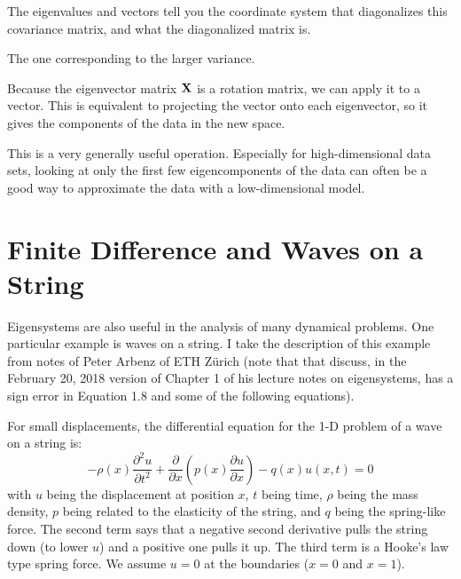 
The eigenvalues and vectors tell you the coordinate system that
diagonalizes this covariance matrix, and what the diagonalized matrix
is.


\begin{answer}
The one corresponding to the larger variance.
\end{answer}

Because the eigenvector matrix ${\bf X}$ is a rotation matrix, we can
apply it to a vector.  This is equivalent to projecting the vector
onto each eigenvector, so it gives the components of the data in the
new space.

This is a very generally useful operation. Especially for
high-dimensional data sets, looking at only the first few
eigencomponents of the data can often be a good way to approximate the
data with a low-dimensional model.

\section{Finite Difference and Waves on a String}

Eigensystems are also useful in the analysis of many dynamical
problems. One particular example is waves on a string. I take the
description of this example from notes of Peter Arbenz of ETH Z\"urich
(note that that discuss, in the February 20, 2018 version of Chapter 1
of his lecture notes on eigensystems, has a sign error in Equation 1.8
and some of the following equations).

For small displacements, the differential equation for the 1-D problem
of a wave on a string is:
\begin{equation}
- \rho(x) \frac{\partial^2 u}{\partial t^2}
+ \frac{\partial }{\partial x}\left(p(x) \frac{\partial u}{\partial
  x}\right)
- q(x) u(x, t) = 0
\end{equation}
with $u$ being the displacement at position $x$, $t$ being time,
$\rho$ being the mass density, $p$ being related to the elasticity of
the string, and $q$ being the spring-like force. The second term says
that a negative second derivative pulls the string down (to lower $u$)
and a positive one pulls it up. The third term is a Hooke's law type
spring force. We assume $u=0$ at the boundaries ($x=0$ and $x=1$).

